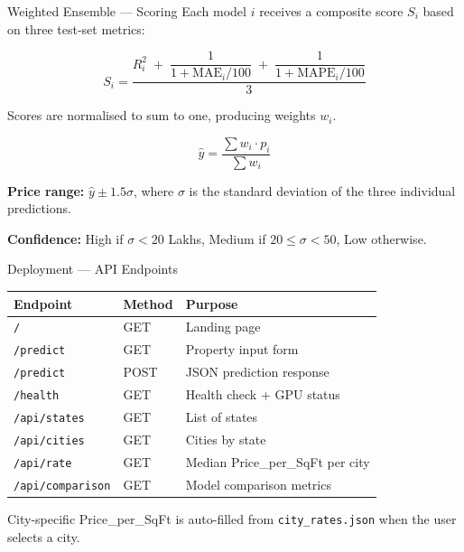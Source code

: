 \documentclass[aspectratio=169, 12pt]{beamer}
\begin{document}
\begin{frame}{Weighted Ensemble --- Scoring}
  Each model $i$ receives a composite score $S_i$ based on three test-set metrics:

  \medskip
  \[
  S_i = \frac{ R^2_i \;+\; \dfrac{1}{1+\mathrm{MAE}_i/100} \;+\;
         \dfrac{1}{1+\mathrm{MAPE}_i/100} }{3}
  \]

  \medskip
  Scores are normalised to sum to one, producing weights $w_i$.

  \[
  \hat{y} = \frac{\sum w_i \cdot p_i}{\sum w_i}
  \]

  \medskip
  \textbf{Price range:} $\hat{y} \pm 1.5\sigma$, where $\sigma$ is the
  standard deviation of the three individual predictions.

  \medskip
  \textbf{Confidence:} High if $\sigma < 20$ Lakhs, Medium if
  $20\le\sigma<50$, Low otherwise.
\end{frame}

\begin{frame}{Deployment --- API Endpoints}
  \begin{center}
    \small
    \begin{tabular}{lll}
      \toprule
      Endpoint & Method & Purpose \\
      \midrule
      \texttt{/} & GET & Landing page \\
      \texttt{/predict} & GET & Property input form \\
      \texttt{/predict} & POST & JSON prediction response \\
      \texttt{/health} & GET & Health check + GPU status \\
      \texttt{/api/states} & GET & List of states \\
      \texttt{/api/cities} & GET & Cities by state \\
      \texttt{/api/rate} & GET & Median Price\_per\_SqFt per city \\
      \texttt{/api/comparison} & GET & Model comparison metrics \\
      \bottomrule
    \end{tabular}
  \end{center}

  City-specific Price\_per\_SqFt is auto-filled from
  \texttt{city\_rates.json} when the user selects a city.
\end{frame}

\end{document}
